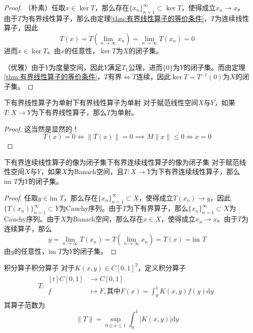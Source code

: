 \documentclass[lang = cn, scheme = chinese, thmcnt = section]{elegantbook}
\newcommand{\sub}{\subset}             %
\newcommand{\im}{\text{im }}           %
\begin{document}
\begin{proof}
	（朴素）任取$x\in\overline{\ker T}$，那么存在$\{ x_n \}_{n=1}^{\infty}\subset \ker T$，使得成立$x_n\to x$。由于$T$为有界线性算子，那么由定理\ref{thm:有界线性算子的等价条件}，$T$为连续线性算子，因此
	$$
	T(x)=T(\lim_{n\to\infty}x_n)=\lim_{n\to\infty}T(x_n)=0
	$$
	进而$x\in \ker T$。由$x$的任意性，$\ker T$为$X$的闭子集。
	
	（优雅）由于$Y$为度量空间，因此$Y$满足$T_1$公理，进而$\{0\}$为$Y$的闭子集。而由定理\ref{thm:有界线性算子的等价条件}，$T$有界$\iff T$连续，因此$\ker T=T^{-1}(0)$为$X$的闭子集。
\end{proof}

\begin{proposition}{下有界线性算子为单射}{下有界线性算子为单射}
	对于赋范线性空间$X$与$Y$，如果$T:X\to Y$为下有界线性算子，那么$T$为单射。
\end{proposition}

\begin{proof}
	这当然是显然的！
	$$
	T(x)=0
	\iff \|T(x)\|=0
	\implies M\|x\|\le 0
	\iff x=0
	$$
\end{proof}

\begin{proposition}{下有界连续线性算子的像为闭子集}{下有界连续线性算子的像为闭子集}
	对于赋范线性空间$X$与$Y$，如果$X$为Banach空间，且$T:X\to Y$为下有界连续线性算子，那么$\im T$为$Y$的闭子集。
\end{proposition}

\begin{proof}
	任取$y\in \overline{\im T}$，那么存在$\{x_n\}_{n=1}^{\infty}\sub X$，使得成立$T(x_n)\to y$，因此$\{T(x_n)\}_{n=1}^{\infty}\sub Y$为Cauchy序列。由于$T$为下有界算子，那么$\{x_n\}_{n=1}^{\infty}\sub X$为Cauchy序列。由于$X$为Banach空间，那么存在$x\in X$，使得成立$x_n\to x$。由于$T$为连续算子，那么
	$$
	y=\lim_{n\to\infty} T(x_n)
	=T(\lim_{n\to\infty}x_n)
	=T(x)
	=\im T
	$$
	由$y$的任意性，$\im T$为$Y$的闭子集。
\end{proof}

\begin{proposition}{积分算子}{积分算子}
	对于$K(x,y)\in C[0,1]^2$，定义积分算子
	\begin{align*}
		T:\begin{aligned}[t]
			C[0,1]&\longrightarrow C[0,1]\\
			f&\longmapsto F, \text{其中} F(x)=\int_0^1K(x,y)f(y)\mathrm{d}y 
		\end{aligned}
	\end{align*}
	其算子范数为
	$$
	\|T\|=\sup_{0\le x\le 1}\int_0^1|K(x,y)|\mathrm{d}y
	$$
\end{proposition}
\end{document}
